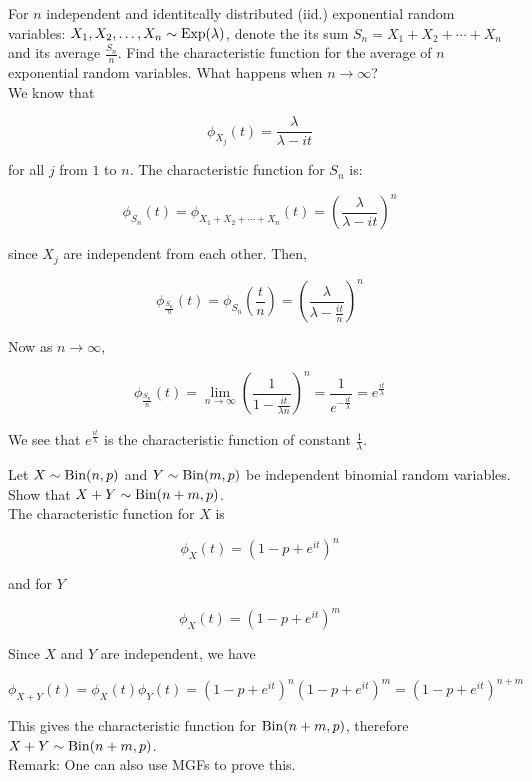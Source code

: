 \begin{texample}
	For $n$ independent and identitcally distributed (iid.) exponential random variables: $X_1,X_2,\dots,X_n\sim\operatorname{Exp}(\lambda)$, denote the its sum $S_n=X_1+X_2+\cdots+X_n$ and its average $\frac{S_n}{n}$. Find the characteristic function for the average of $n$ exponential random variables. What happens when $n\to\infty$? \\
	
	We know that
	
	\[\phi_{X_j}(t)=\frac{\lambda}{\lambda-it}\]
	
	for all $j$ from $1$ to $n$. The characteristic function for $S_n$ is:
	
	\[\phi_{S_n}(t)=\phi_{X_1+X_2+\cdots+X_n}(t)=\left( \frac{\lambda}{\lambda-it} \right)^n\]
	
	since $X_j$ are independent from each other. Then,
	
	\[\phi_{\frac{S_n}{n}}(t)=\phi_{S_n}\left(\frac{t}{n}\right)=\left( \frac{\lambda}{\lambda-\frac{it}{n}} \right)^n\]
	
	Now as $n\to\infty$,
	
	\[\phi_{\frac{S_n}{n}}(t)=\lim_{n\to\infty} \left( \frac{1}{1-\frac{it}{\lambda n}} \right)^n=\frac{1}{e^{-\frac{it}{\lambda}}}=e^{\frac{it}{\lambda}}\]
	
	We see that $e^{\frac{it}{\lambda}}$ is the characteristic function of constant $\frac{1}{\lambda}$.
\end{texample}

\begin{texample}
	Let $X\sim\operatorname{Bin}(n,p)$ and $Y\sim\operatorname{Bin}(m,p)$ be independent binomial random variables. Show that $X+Y\sim\operatorname{Bin}(n+m,p)$. \\
	
	The characteristic function for $X$ is
	
	\[\phi_X(t)=(1-p+e^{it})^n\]
	
	and for $Y$
	
	\[\phi_X(t)=(1-p+e^{it})^m\]
	
	Since $X$ and $Y$ are independent, we have
	
	\[\phi_{X+Y}(t)=\phi_X(t)\phi_Y(t)=(1-p+e^{it})^n(1-p+e^{it})^m=(1-p+e^{it})^{n+m}\]
	
	This gives the characteristic function for $\operatorname{Bin}(n+m,p)$, therefore $X+Y\sim\operatorname{Bin}(n+m,p)$. \\
	
	Remark: One can also use MGFs to prove this.
\end{texample}

